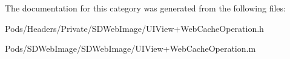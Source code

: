 The documentation for this category was generated from the following files\+:\begin{DoxyCompactItemize}
\item 
Pods/\+Headers/\+Private/\+S\+D\+Web\+Image/U\+I\+View+\+Web\+Cache\+Operation.\+h\item 
Pods/\+S\+D\+Web\+Image/\+S\+D\+Web\+Image/U\+I\+View+\+Web\+Cache\+Operation.\+m\end{DoxyCompactItemize}
